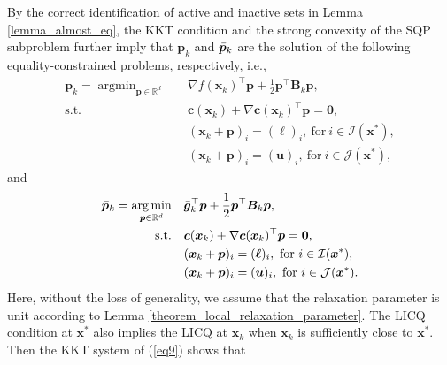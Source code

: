 \documentclass[aos]{imsart}
\numberwithin{equation}{section}
\theoremstyle{plain}
\begin{document}
By the correct identification of active and inactive sets in Lemma \ref{lemma_almost_eq}, the KKT condition and the strong convexity of the SQP subproblem further imply that $\bm{p}_k$ and $\Bar{\bm{p}}_k$ are the solution of the following equality-constrained problems, respectively, i.e.,
   \begin{equation*}
       \begin{split}
        \bm{p}_k = \mathop{\arg \min}_{\bm{p} \in \mathbb{R}^{d}} & \hspace{1em}  \nabla f(\bm{x}_k)^{\top}\bm{p}+ \frac{1}{2}\bm{p}^{\top}\bm{B}_k\bm{p},\\
        \text{s.t.} & \hspace{1em} \bm{c}(\bm{x}_k)+\nabla \bm{c}(\bm{x}_k)^{\top}\bm{p} = \bm{0},\\
        & \hspace{1em} (\bm{x}_k + \bm{p})_i = (\bm{\ell})_i,~\text{for}~ i \in \mathcal{I}(\bm{x}^{*}),\\
        & \hspace{1em} (\bm{x}_k + \bm{p})_i = (\bm{u})_i,~\text{for}~ i \in \mathcal{J}(\bm{x}^{*}),
    \end{split}    
   \end{equation*}
   and
   \begin{equation}
   \label{eq9}
       \begin{split}
        \Bar{\bm{p}}_k = \mathop{\arg \min}_{\bm{p} \in \mathbb{R}^{d}} & \hspace{1em}  \Bar{\bm{g}}_k^{\top}\bm{p}+ \frac{1}{2}\bm{p}^{\top}\bm{B}_k\bm{p},\\
        \text{s.t.} & \hspace{1em} \bm{c}(\bm{x}_k)+\nabla \bm{c}(\bm{x}_k)^{\top}\bm{p} = \bm{0},\\
        & \hspace{1em} (\bm{x}_k + \bm{p})_i = (\bm{\ell})_i,~\text{for}~ i \in \mathcal{I}(\bm{x}^{*}),\\
        & \hspace{1em} (\bm{x}_k + \bm{p})_i = (\bm{u})_i,~\text{for}~ i \in \mathcal{J}(\bm{x}^{*}).
    \end{split}    
   \end{equation}
   Here, without the loss of generality, we assume that the relaxation parameter is unit according to Lemma \ref{theorem_local_relaxation_parameter}. The LICQ condition at $\bm{x}^{*}$ also implies the LICQ at $\bm{x}_k$ when $\bm{x}_k$ is sufficiently close to $\bm{x}^{*}$. Then the KKT system of (\ref{eq9}) shows that
\end{document}

